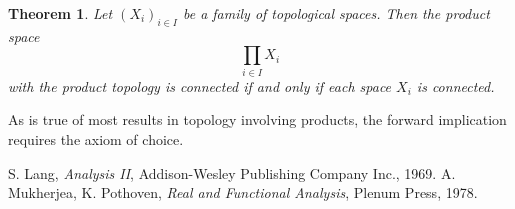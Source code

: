 \documentclass[12pt]{article}
\newtheorem{Theorem}{Theorem}
\begin{document}
\begin{Theorem}\cite{lang, mukherjea}
Let $(X_i)_{i\in I}$ be a family of topological spaces. 
Then the product space 
 \[\prod_{i\in I}X_i\]
with the product topology is connected if and only if each 
space $X_i$ is connected.  
\end{Theorem}

As is true of most results in topology
involving products,
the forward implication requires the axiom of choice.
 
\begin{thebibliography}{9}
 S. Lang, \emph{Analysis II},
 Addison-Wesley Publishing Company Inc., 1969.
 A. Mukherjea, K. Pothoven,
 \emph{Real and Functional Analysis},
 Plenum Press, 1978.
\end{thebibliography}
\end{document}
